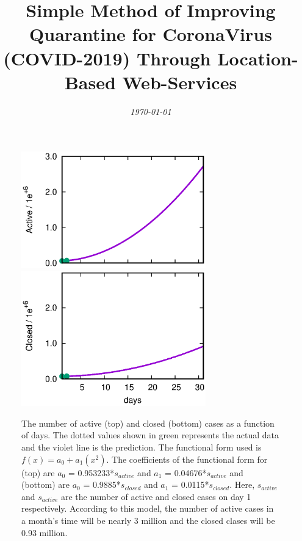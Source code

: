 \documentclass[a4paper]{article}
\title {Simple Method of Improving Quarantine for CoronaVirus (COVID-2019) Through Location-Based Web-Services}
\date{\it{\today}}
\begin{document}
\maketitle
                \begin{figure}
                \centering
                \includegraphics[clip=true,trim=0cm 0cm 0cm
                0cm,width=8cm]{ps.predict.active.ps}\\
			\vspace{-1.43cm}
                \includegraphics[clip=true,trim=0cm 0cm 0cm
                0cm,width=8cm]{ps.predict.closed.ps}
			\caption{The number of active (top) and closed (bottom) cases as a function of days. The dotted values shown in green represents the actual data and the violet line is the prediction. The functional form used is $f(x) = a_0 + a_1(x^2)$. The coefficients of the functional form for (top) are $a_0$ = 0.953233*$s_{active}$ and $a_1$ = 0.04676*$s_{active}$ and (bottom) are $a_0$ = 0.9885*$s_{closed}$ and $a_1$ = 0.0115*$s_{closed}$. Here, $s_{active}$ and $s_{active}$ are the number of active and closed cases on day 1 respectively. According to this model, the number of active cases in a month's time will be nearly 3 million and the closed clases will be 0.93 million.}
                \label{fig:fig1}
                \end{figure}
\end{document}
